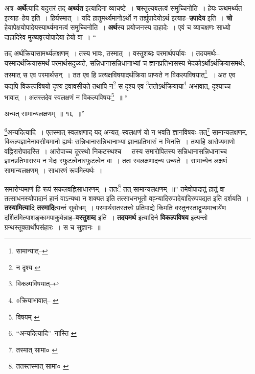 \documentclass[article,12pt,a4paper]{memoir}
\begin{document}
	  \pstart अत्र--\textbf{अर्थे}त्यादि यदुत्तरं तद् \textbf{अर्थ्यत} इत्यादिना व्याचष्टे । \textbf{च}स्तुल्यबलत्वं समुच्चिनोति । हेयः कथमर्थ्यत इत्याह--हेय इति । हिर्यस्मात् । यदि हातुमर्थ्यमानोऽर्थो न तर्ह्युपादेयोऽर्थ इत्याह--\textbf{उपादेय} इति । \textbf{चो} हेयापेक्षयोपादेयस्यार्थ्यमानत्वं समुच्चिनोति । \textbf{अर्थ}स्य प्रयोजनस्य दाहादेः । एवं च व्याचक्षणः साध्यो दाहादिरेव मुख्यवृत्त्योपादेया हेयो वा । \leavevmode{} “
	  
	तद् अर्थक्रियासामर्थ्यलक्षणम् । तस्य भावः, तस्मात् । वस्तुशब्दः परमार्थपर्यायः । तदयमर्थः--यस्मादर्थक्रियासमर्थं परमार्थसदुच्यते, सन्निधानासन्निधानाभ्यां च ज्ञानप्रतिभासस्य भेदकोऽर्थोऽर्थक्रियासमर्थः, तस्मात् स एव परमार्थसन् । तत एव हि प्रत्यक्षविषयादर्थक्रिया प्राप्यते न विकल्पविषयात्\footnote{सामान्यात्--\cite{dp-msD-n}} । अत एव यद्यपि विकल्पविषयो दृश्य इवावसीयते तथापि न\footnote{न दृश्य \cite{dp-msA} \cite{dp-msB} \cite{dp-edP} \cite{dp-edH} \cite{dp-edE} \cite{dp-edN}} स दृश्य एव \footnote{विकल्पविषयात्--\cite{dp-msD-n}}ततोऽर्थक्रियाया\footnote{०क्रियाभावात्--\cite{dp-msA} \cite{dp-msB} \cite{dp-edP} \cite{dp-edH} \cite{dp-edE} \cite{dp-edN}} अभावात्, दृश्याच्च भावात् । अतस्तदेव स्वलक्षणं न विकल्पविषयः\footnote{विषयम् \cite{dp-msA} \cite{dp-msB} \cite{dp-edP} \cite{dp-edH} \cite{dp-edE} \cite{dp-edN}} ॥ “
	  
	अन्यत् सामान्यलक्षणम् ॥ १६ ॥” 
	  
	\footnote{“अन्यदित्यादि”--नास्ति \cite{dp-msA} \cite{dp-edP} \cite{dp-edH} \cite{dp-edE} \cite{dp-edN}}अन्यदित्यादि । एतस्मात् स्वलक्षणाद् यद् अन्यत्--स्वलक्षणं यो न भवति ज्ञानविषयः--तत्\footnote{तस्मात् सामा० \cite{dp-msB}} सामान्यलक्षणम्, विकल्पज्ञानेनावसीयमानो ह्यर्थः सन्निधानासन्निधानाभ्यां ज्ञानप्रतिभासं न भिनत्ति । तथाहि आरोप्यमाणो वह्निरारोपादस्ति । आरोपाच्च दूरस्थो निकटस्थश्च । तस्य समारोपितस्य सन्निधानासन्निधानाच्च ज्ञानप्रतिभासस्य न भेदः स्फुटत्वेनास्फुटत्वेन वा । ततः स्वलक्षणादन्य उच्यते । सामान्येन लक्षणं सामान्यलक्षणम् । साधारणं रूपमित्यर्थः । 
	  
	समारोप्यमाणं हि रूपं सकलवह्निसाधारणम् । ततः\footnote{ततस्तस्मात् सामा० \cite{dp-msB}} तत् सामान्यलक्षणम् ॥” तमेवोपादातुं हातुं वा तत्साधनस्योपादानं हानं वाऽन्यथा न शक्यत इति तत्साधनभूतो वह्न्यादिरुपादेयादिरुपपद्यत इति दर्शयति । \textbf{तस्यामित्या}दि \textbf{तस्मादि}त्यन्तं सुबोधम् । परमार्थसतस्तत्त्वे प्रतिपाद्ये किमति वस्तुनस्ताद्रूप्यमाचार्येण दर्शितमित्याशङ्कामपाकुर्वन्नाह--\textbf{वस्तुशब्द} इति । \textbf{तदयमर्थ} इत्यादिर्न \textbf{विकल्पविषय} इत्यन्तो ग्रन्थस्तूक्तार्थोपसंहारः । स च सुज्ञानः ॥
	\pend
      
\end{document}
